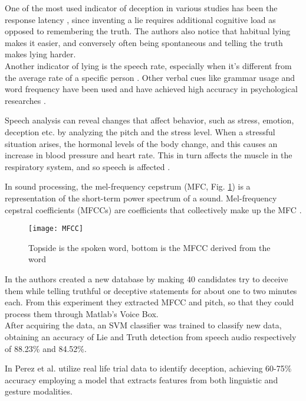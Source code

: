 One of the most used indicator of deception in various studies has been the response latency \cite{EaseLying}, since inventing a lie requires additional cognitive load as opposed to remembering the truth. The authors also notice that habitual lying makes it easier, and conversely often being spontaneous and telling the truth makes lying harder.\\
Another indicator of lying is the speech rate, especially when it's different from the average rate of a specific person \cite{TemporalCues}. Other verbal cues like grammar usage and word frequency have been used and have achieved high accuracy in psychological researches \cite{PorterTruthLying}.

Speech analysis can reveal changes that affect behavior, such as stress, emotion, deception etc. by analyzing the pitch and the stress level. When a stressful situation arises, the hormonal levels of the body change, and this causes an increase in blood pressure and heart rate. This in turn affects the muscle in the respiratory system, and so speech is affected \cite{norena}.

In sound processing, the mel-frequency cepstrum (MFC, Fig. \ref{fig:MFCC}) is a representation of the short-term power spectrum of a sound. Mel-frequency cepstral coefficients (MFCCs) are coefficients that collectively make up the MFC \cite{wiki:mfcc}.

\begin{figure}[H]
	\centering
	\texttt{[image: MFCC]}
	\caption{Topside is the spoken word, bottom is the MFCC derived from the word}
	\label{fig:MFCC}
\end{figure}

In \cite{relidss} the authors created a new database by making 40 candidates try to deceive them while telling truthful or deceptive statements for about one to two minutes each. From this experiment they extracted MFCC and pitch, so that they could process them through Matlab's Voice Box. \\
After acquiring the data, an SVM classifier was trained to classify new data, obtaining an accuracy of Lie and Truth detection from speech audio respectively of 88.23\% and 84.52\%.

In \cite{Perez-Rosas:2015:DDU:2818346.2820758} \cite{Mihalcea:2013:ADD:2522848.2522888} Perez et al. utilize real life trial data to identify deception, achieving 60-75\% accuracy employing a model that extracts features from both linguistic and gesture modalities.
 
